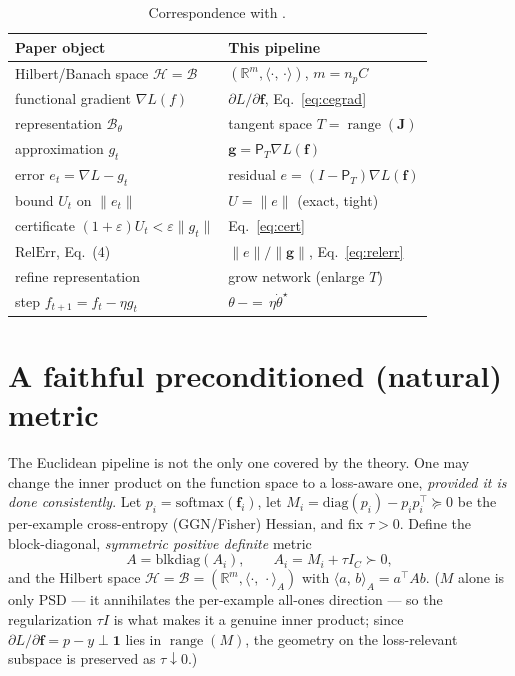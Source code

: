 \documentclass[conference]{IEEEtran}
\theoremstyle{remark}
\DeclareMathOperator{\range}{range}
\newcommand{\R}{\mathbb{R}}
\newcommand{\inner}[2]{\langle #1,\, #2\rangle}
\newcommand{\norm}[1]{\lVert #1\rVert}
\newcommand{\grad}{\nabla}
\newcommand{\PT}{\mathsf{P}_{T}}
\newcommand{\eps}{\varepsilon}
\newcommand{\J}{\mathbf{J}}
\newcommand{\f}{\bm{f}}
\newcommand{\g}{\bm{g}}
\newcommand{\rerr}{\mathrm{RelErr}}
\newcommand{\transpose}{^{\!\top}}
\begin{document}
\begin{table}[t]
\centering
\caption{Correspondence with \cite{fgd}.}
\label{tab:map}
\begin{tabular}{ll}
\hline
Paper object & This pipeline \\
\hline
Hilbert/Banach space $\mathcal H{=}\mathcal B$ & $(\R^{m},\inner\cdot\cdot)$, $m{=}n_pC$ \\
functional gradient $\grad L(f)$ & $\partial L/\partial\f$, Eq.~\eqref{eq:cegrad} \\
representation $\mathcal B_\theta$ & tangent space $T=\range(\J)$ \\
approximation $g_t$ & $\g=\PT\grad L(\f)$ \\
error $e_t=\grad L{-}g_t$ & residual $e=(I-\PT)\grad L(\f)$ \\
bound $U_t$ on $\norm{e_t}$ & $U=\norm{e}$ (exact, tight) \\
certificate $(1{+}\eps)U_t{<}\eps\norm{g_t}$ & Eq.~\eqref{eq:cert} \\
$\rerr$, Eq.~(4) & $\norm{e}/\norm{\g}$, Eq.~\eqref{eq:relerr} \\
refine representation & grow network (enlarge $T$) \\
step $f_{t+1}{=}f_t{-}\eta g_t$ & $\theta\,{-}{=}\,\eta\dot\theta^\star$ \\
\hline
\end{tabular}
\end{table}

\section{A faithful preconditioned (natural) metric}\label{sec:natural}
The Euclidean pipeline is not the only one covered by the theory. One may change
the inner product on the function space to a loss-aware one, \emph{provided it is
done consistently}. Let $p_i=\mathrm{softmax}(\f_i)$, let
$M_i=\mathrm{diag}(p_i)-p_ip_i\transpose\succeq0$ be the per-example
cross-entropy (GGN/Fisher) Hessian, and fix $\tau>0$. Define the
block-diagonal, \emph{symmetric positive definite} metric
\begin{equation}
A=\mathrm{blkdiag}(A_i),\qquad A_i=M_i+\tau I_C\succ0,
\end{equation}
and the Hilbert space $\mathcal H=\mathcal B=(\R^m,\inner{\cdot}{\cdot}_A)$ with
$\inner{a}{b}_A=a\transpose A b$. ($M$ alone is only PSD --- it annihilates the
per-example all-ones direction --- so the regularization $\tau I$ is what makes it
a genuine inner product; since $\partial L/\partial\f=p-y\perp\mathbf 1$ lies in
$\range(M)$, the geometry on the loss-relevant subspace is preserved as
$\tau\downarrow0$.)
\end{document}
